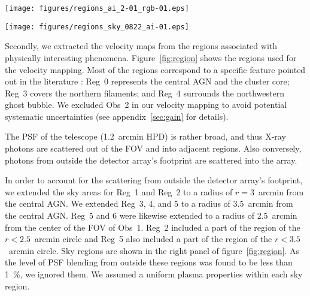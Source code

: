\begin{figure*}
 \begin{minipage}{0.495\hsize}
  \centering
  \texttt{[image: figures/regions\_ai\_2-01\_rgb-01.eps]}
 \end{minipage}
 \begin{minipage}{0.495\hsize}
  \centering
  \texttt{[image: figures/regions\_sky\_0822\_ai-01.eps]}
 \end{minipage}
 \caption{The regions used for the velocity mapping. {\it Left:} distinct regions defined by discrete pixels are identified by color coding and number and overlaid on the Chandra relative deviation image. {\it Right:} the corresponding regions when PSF is taken into account. The Chandra X-ray contours are overlaid. H$\alpha$ contours \citep{conselice01} are also overlaid in white (left) or red (right). The solid-lined polygons are the regions associated with Obs~1 or Obs~3, and the dashed-lined polygons are the regions associated with Obs~4. See also figure~\ref{fig:fov}.}\label{fig:region}
\end{figure*}

Secondly, we extracted the velocity maps from the regions associated with physically interesting phenomena. Figure~\ref{fig:region} shows the regions used for the velocity mapping. Most of the regions correspond to a specific feature pointed out in the literature \citep[e.g.][]{Churazov00,Fabian06,salome2011}: Reg~0 represents the central AGN and the cluster core; Reg~3 covers the northern filaments; and Reg~4 surrounds the northwestern ghost bubble. We excluded Obs~2 in our velocity mapping to avoid potential systematic uncertainties (see appendix~\ref{sec:gain} for details).

The PSF of the telescope (1.2~arcmin HPD) is rather broad, and thus X-ray photons are scattered out of the FOV and into adjacent regions. Also conversely, photons from outside the detector array's footprint are scattered into the array.

In order to account for the scattering from outside the detector array's footprint, we extended the sky areas for Reg~1 and Reg~2 to a radius of $r=3$~arcmin from the central AGN. We extended Reg~3, 4, and 5 to a radius of 3.5~arcmin from the central AGN. Reg~5 and 6 were likewise extended to a radius of 2.5~arcmin from the center of the FOV of Obs~1. Reg~2 included a part of the region of the $r < 2.5$~arcmin circle and Reg~5 also included a part of the region of the $r < 3.5$~arcmin circle. Sky regions are shown in the right panel of figure~\ref{fig:region}. As the level of PSF blending from outside these regions was found to be less than 1~\%, we ignored them. We assumed a uniform plasma properties within each sky region.

